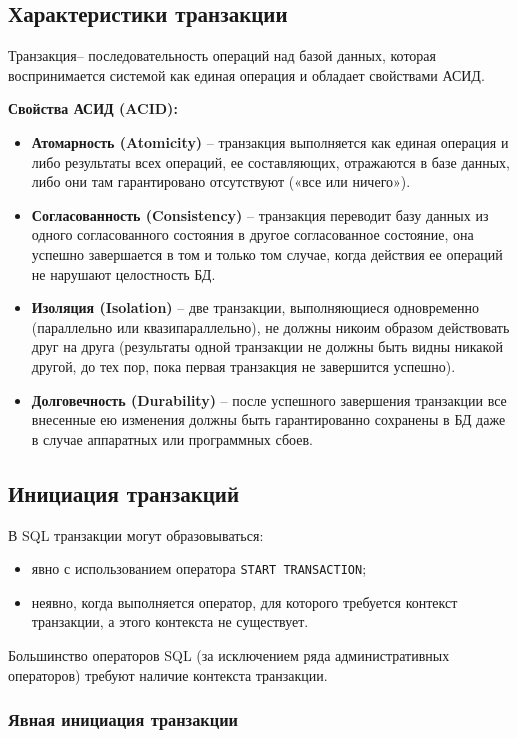 \documentclass[a4paper,12pt]{article}
\begin{document}
\subsection{Характеристики транзакции}

Транзакция– последовательность операций над базой данных, которая воспринимается системой как единая операция и обладает свойствами АСИД.

\textbf{Свойства АСИД (ACID):}
\begin{itemize}
    \item \textbf{Атомарность (Atomicity)} – транзакция выполняется как единая операция и либо результаты всех операций, ее составляющих, отражаются в базе данных, либо они там гарантировано отсутствуют («все или ничего»).
    \item \textbf{Согласованность (Consistency)} – транзакция переводит базу данных из одного согласованного состояния в другое согласованное состояние, она успешно завершается в том и только том случае, когда действия ее операций не нарушают целостность БД.
    \item \textbf{Изоляция (Isolation)} – две транзакции, выполняющиеся одновременно (параллельно или квазипараллельно), не должны никоим образом действовать друг на друга (результаты одной транзакции не должны быть видны никакой другой, до тех пор, пока первая транзакция не завершится успешно).
    \item \textbf{Долговечность (Durability)} – после успешного завершения транзакции все внесенные ею изменения должны быть гарантированно сохранены в БД даже в случае аппаратных или программных сбоев.
\end{itemize}

\subsection{Инициация транзакций}

В SQL транзакции могут образовываться:
\begin{itemize}
    \item явно с использованием оператора \texttt{START TRANSACTION};
    \item неявно, когда выполняется оператор, для которого требуется контекст транзакции, а этого контекста не существует.
\end{itemize}

Большинство операторов SQL (за исключением ряда административных операторов) требуют наличие контекста транзакции.

\subsubsection{Явная инициация транзакции}
\end{document}
